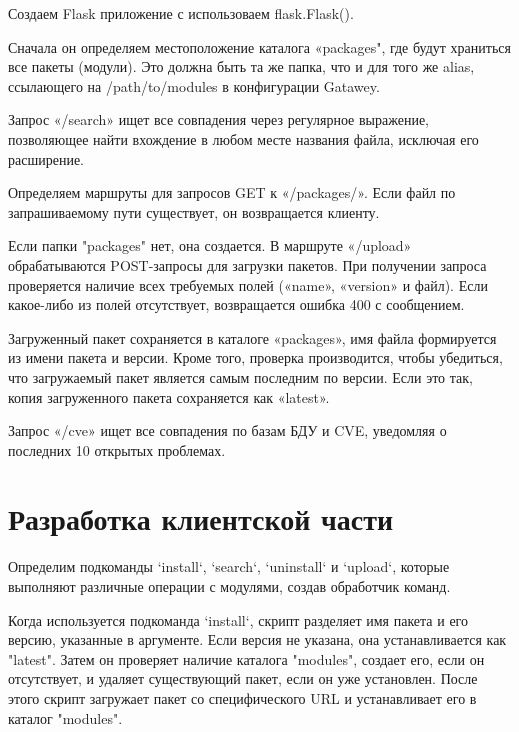 Создаем Flask приложение с использоваем flask.Flask(). 

Сначала он определяем местоположение каталога «packages", где будут храниться все пакеты (модули). Это должна быть та же папка, что и для того же alias, ссылающего на /path/to/modules в конфигурации Gatawey. 

\begin{listing}[H]
\end{listing}
\label{lst:c}

Запрос «/search» ищет все совпадения через регулярное выражение, позволяющее найти вхождение в любом месте названия файла, исключая его расширение.

Определяем маршруты для запросов GET к «/packages/». Если файл по запрашиваемому пути существует, он возвращается клиенту. 

Если папки "packages" нет, она создается. В маршруте «/upload» обрабатываются POST-запросы для загрузки пакетов. При получении запроса проверяется наличие всех требуемых полей («name», «version» и файл). Если какое-либо из полей отсутствует, возвращается ошибка 400 с сообщением. 

\begin{listing}[H]
\end{listing}
\label{lst:c}

Загруженный пакет сохраняется в каталоге «packages», имя файла формируется из имени пакета и версии. Кроме того, проверка производится, чтобы убедиться, что загружаемый пакет является самым последним по версии. Если это так, копия загруженного пакета сохраняется как «latest». 

\begin{listing}[H]
\end{listing}
\label{lst:c}


Запрос «/cve» ищет все совпадения по базам БДУ и CVE, уведомляя о последних 10 открытых проблемах.


\section{Разработка клиентской части}

Определим подкоманды `install`, `search`, `uninstall` и `upload`, которые выполняют различные операции с модулями, создав обработчик команд.

Когда используется подкоманда `install`, скрипт разделяет имя пакета и его версию, указанные в аргументе. Если версия не указана, она устанавливается как "latest". Затем он проверяет наличие каталога "modules", создает его, если он отсутствует, и удаляет существующий пакет, если он уже установлен. После этого скрипт загружает пакет со специфического URL и устанавливает его в каталог "modules".

